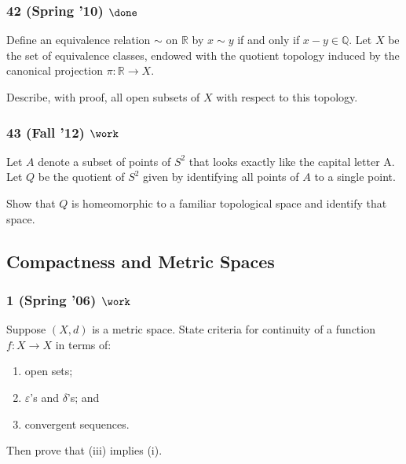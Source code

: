 \hypertarget{spring-10-done-1}{%
\subsubsection{\texorpdfstring{42 (Spring '10)
\(\done\)}{42 (Spring '10) \textbackslash done}}\label{spring-10-done-1}}

\begin{problem}[?]

Define an equivalence relation \(\sim\) on \({\mathbb{R}}\) by
\(x \sim y\) if and only if \(x - y \in {\mathbb{Q}}\). Let \(X\) be the
set of equivalence classes, endowed with the quotient topology induced
by the canonical projection \(\pi : {\mathbb{R}}\to X\).

Describe, with proof, all open subsets of \(X\) with respect to this
topology.

\end{problem}

\hypertarget{fall-12-work}{%
\subsubsection{\texorpdfstring{43 (Fall '12)
\(\work\)}{43 (Fall '12) \textbackslash work}}\label{fall-12-work}}

\begin{problem}[?]

Let \(A\) denote a subset of points of \(S^2\) that looks exactly like
the capital letter A. Let \(Q\) be the quotient of \(S^2\) given by
identifying all points of \(A\) to a single point.

Show that \(Q\) is homeomorphic to a familiar topological space and
identify that space.

\end{problem}

\hypertarget{compactness-and-metric-spaces}{%
\subsection{Compactness and Metric
Spaces}\label{compactness-and-metric-spaces}}

\hypertarget{spring-06-work}{%
\subsubsection{\texorpdfstring{1 (Spring '06)
\(\work\)}{1 (Spring '06) \textbackslash work}}\label{spring-06-work}}

\begin{problem}[?]

Suppose \((X, d)\) is a metric space. State criteria for continuity of a
function \(f : X \to X\) in terms of:

\begin{enumerate}
\def\labelenumi{\roman{enumi}.}
\item
  open sets;
\item
  \(\varepsilon\)'s and \(\delta\)'s; and
\item
  convergent sequences.
\end{enumerate}

Then prove that (iii) implies (i).

\end{problem}


